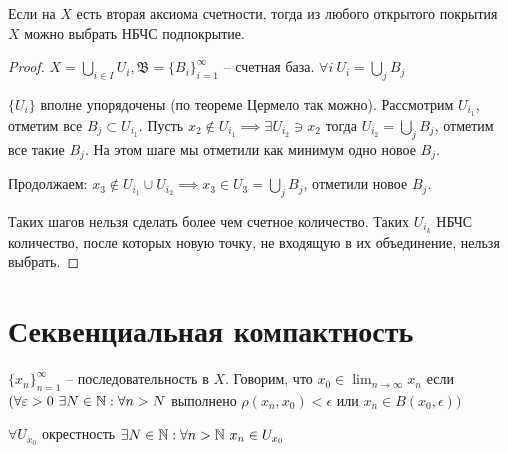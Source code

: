 \documentclass[main]{subfiles}
\begin{document}
\begin{theorem}[Линделёфа]
    Если на $X$ есть вторая аксиома счетности, тогда из любого открытого покрытия $X$ можно выбрать НБЧС подпокрытие.
\end{theorem}
\begin{proof}
    $X = \bigcup_{i \in I} U_i, \mathfrak{B} = \{B_i\}_{i=1}^\infty$  -- счетная база.
    $\forall i\ U_i = \bigcup_{j} B_{j}$



    $\{U_i\}$ вполне упорядочены (по теореме Цермело так можно).
    Рассмотрим $U_{i_1}$, отметим все $B_j \subset U_{i_1}$.
    Пусть $x_2 \not\in U_{i_1} \implies \exists U_{i_2} \ni x_2$
    тогда $U_{i_2} = \bigcup_j B_j$, отметим все такие $B_j$.
    На этом шаге мы отметили как минимум одно новое $B_j$.

    Продолжаем: $x_3 \not\in U_{i_1} \cup U_{i_2} \implies x_3 \in U_3 = \bigcup_j B_j$,
    отметили новое $B_j$.

    Таких шагов нельзя сделать более чем счетное количество.
    Таких  $U_{i_k}$  НБЧС количество, после которых новую точку,
    не входящую в их объединение, нельзя выбрать.
\end{proof}

\section{Секвенциальная компактность}
\begin{definition}
    $\{x_n\}_{n=1}^\infty$ -- последовательность в $X$.
    Говорим, что $x_0 \in \lim_{n \to \infty} x_n$ если
    $(\forall \varepsilon >0\ \exists N \in \mathbb{N} : \forall n > N$ выполнено $\rho(x_n, x_0) < \epsilon$ или $x_n \in B(x_0, \epsilon))$

    $\forall U_{x_0}$ окрестность $\exists N \in \mathbb{N}: \forall n > \mathbb{N} \ x_n \in U_{x_0}$
\end{definition}
\end{document}
